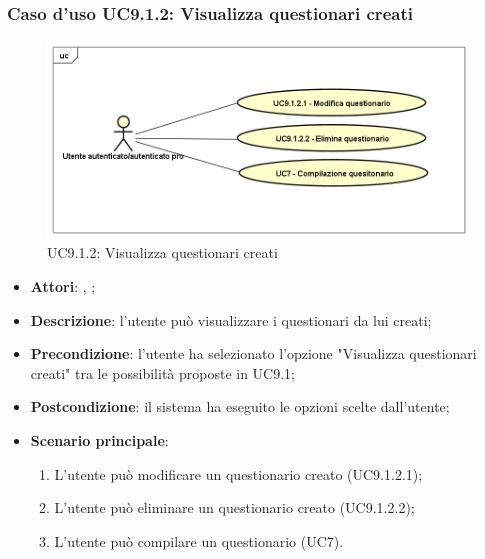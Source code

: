 		\subsubsection{Caso d'uso UC9.1.2: Visualizza questionari creati}
		\label{UC9.1.2}
		\begin{figure}[h]
			\centering
		\includegraphics[scale=0.5,keepaspectratio]{UML/UC9_1_2.png}
			\caption{UC9.1.2: Visualizza questionari creati}
		\end{figure}
		\FloatBarrier
		\begin{itemize}
			\item \textbf{Attori}: \uau, \uaupro;
			\item \textbf{Descrizione}: l'utente può visualizzare i questionari da lui creati;
			\item \textbf{Precondizione}: l'utente ha selezionato l'opzione "Visualizza questionari creati" tra le possibilità proposte in UC9.1;
			\item \textbf{Postcondizione}: il sistema ha eseguito le opzioni scelte dall'utente;
			\item \textbf{Scenario principale}: 
				\begin{enumerate}
					\item L'utente può modificare un questionario creato (UC9.1.2.1);
					\item L'utente può eliminare un questionario creato (UC9.1.2.2);
					\item L'utente può compilare un questionario (UC7).
				\end{enumerate}
		\end{itemize}
		
